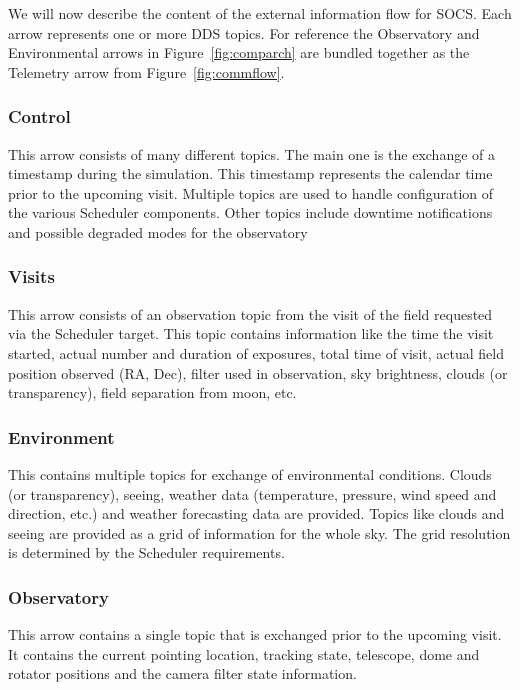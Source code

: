 \documentclass[]{spie}  %
\begin{document}
We will now describe the content of the external information flow for SOCS. Each arrow represents one or more DDS topics. For reference the Observatory and Environmental arrows in Figure~\ref{fig:comparch} are bundled together as the Telemetry arrow from Figure~\ref{fig:commflow}.

\subsubsection{Control}

This arrow consists of many different topics. The main one is the exchange of a timestamp during the simulation. This timestamp represents the calendar time prior to the upcoming visit. Multiple topics are used to handle configuration of the various Scheduler components. Other topics include downtime notifications and possible degraded modes for the observatory

\subsubsection{Visits}

This arrow consists of an observation topic from the visit of the field requested via the Scheduler target. This topic contains information like the time the visit started, actual number and duration of exposures, total time of visit, actual field position observed (RA, Dec), filter used in observation, sky brightness, clouds (or transparency), field separation from moon, etc.

\subsubsection{Environment}

This contains multiple topics for exchange of environmental conditions. Clouds (or transparency), seeing, weather data (temperature, pressure, wind speed and direction, etc.) and weather forecasting data are provided. Topics like clouds and seeing are provided as a grid of information for the whole sky. The grid resolution is determined by the Scheduler requirements.

\subsubsection{Observatory}

This arrow contains a single topic that is exchanged prior to the upcoming visit. It contains the current pointing location, tracking state, telescope, dome and rotator positions and the camera filter state information.
\end{document}
